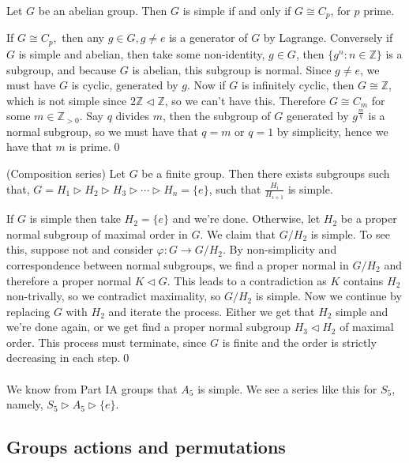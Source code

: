 \documentclass{article}
\newcommand{\nrm}{\triangleleft}
\begin{document}
\begin{itemize}
\begin{proposition}
  Let $ G $ be an abelian group. Then $ G $ is simple if and only if  $ G\cong C_p $, for $ p $ prime.
\end{proposition}
\pf If $ G\cong C_p, $ then any $ g\in G, g\ne e $ is a generator of $ G $ by Lagrange. Conversely if $ G $ is simple and abelian, then take some non-identity, $ g\in G $, then $ \{g^n :n\in \mathbb Z\} $ is a subgroup, and because $ G $ is abelian, this subgroup is normal. Since $ g\ne e $, we must have $ G $ is cyclic, generated by $ g $. Now if $ G $ is infinitely cyclic, then $ G\cong\mathbb Z $, which is not simple since $ 2\mathbb Z\nrm \mathbb Z $, so we can't have this. Therefore $ G\cong C_m $ for some $ m\in \mathbb Z_{>0} $. Say $ q $ divides $ m $, then the subgroup of $ G $ generated by $ g^{\frac mq} $ is a normal subgroup, so we must have that $ q=m $ or $ q=1 $ by simplicity, hence we have that $ m $ is prime.\qed
\begin{theorem}
	(Composition series) Let $ G $ be a finite group. Then there exists subgroups such that, $ G=H_1\triangleright H_2\triangleright H_3\triangleright\cdots \triangleright H_n=\{e\} $, such that $ \frac {H_i}{H_{i+1}} $ is simple.
\end{theorem}
\pf If $ G $ is simple then take $ H_2=\{e\} $ and we're done. Otherwise, let $ H_2 $ be a proper normal subgroup of maximal order in $ G $. We claim that $ G/H_2 $ is simple. To see this, suppose not and consider $ \varphi: G\to G/H_2 $.
 By non-simplicity and correspondence between normal subgroups, we find a proper normal in $ G/H_2 $ and therefore a proper normal $ K\nrm G $. This leads to a contradiction as $ K $ contains $ H_2 $ non-trivally, so we contradict maximality, so $ G/H_2 $ is simple. Now we continue by replacing $ G $ with $ H_2 $ and iterate the process. Either we get that $ H_2 $ simple and we're done again, or we get find a proper normal subgroup $ H_3\nrm H_2 $ of maximal order. This process must terminate, since $ G $ is finite and the order is strictly decreasing in each step.\qed\\\\
 We know from Part IA groups that $ A_5 $ is simple. We see a series like this for $ S_5 $, namely, $ S_5\triangleright A_5\triangleright \{e\} $.
 \subsection{Groups actions and permutations}


\end{itemize}
\end{document}
